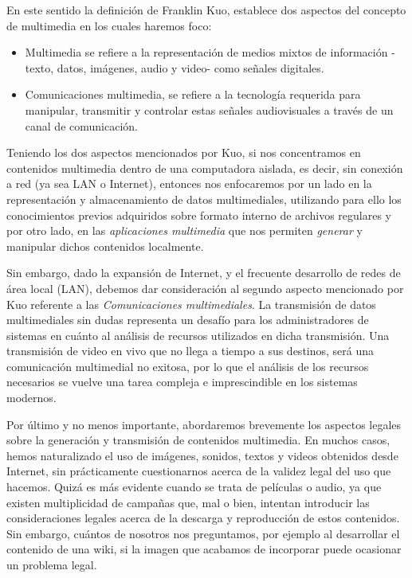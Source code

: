 \documentclass[12pt]{article}
\begin{document}
En este sentido la definición de Franklin Kuo, establece dos aspectos del
concepto de multimedia en los cuales haremos foco:

\begin{itemize}
\item Multimedia se refiere a la representación de medios mixtos de información
-texto, datos, imágenes, audio y video- como señales digitales. 
\item Comunicaciones multimedia, se refiere a la tecnología requerida para 
manipular, transmitir y controlar estas señales audiovisuales a través de un 
canal de comunicación.\cite{frankuo}
\end{itemize}


Teniendo los dos aspectos mencionados por Kuo, si nos concentramos en contenidos 
multimedia dentro de una computadora aislada, es decir, sin conexión a red (ya sea LAN o 
Internet), entonces nos enfocaremos por un lado en la representación y almacenamiento 
de datos multimediales, utilizando para ello los conocimientos previos 
adquiridos sobre formato interno de archivos regulares y por otro lado, en 
las {\it aplicaciones multimedia} que nos permiten {\it generar} y manipular 
dichos contenidos localmente. 

Sin embargo, dado la expansión de Internet, y el frecuente desarrollo 
de redes de área local (LAN), debemos dar consideración al segundo aspecto mencionado
por Kuo referente a las {\it Comunicaciones multimediales}. La transmisión 
de datos multimediales sin dudas representa un desafío para los administradores
de sistemas en cuánto al análisis de recursos utilizados en dicha transmisión.
Una transmisión de video en vivo que no llega a tiempo a sus destinos, será 
una comunicación multimedial no exitosa, por lo que el análisis de los 
recursos necesarios se vuelve una tarea compleja e imprescindible en los 
sistemas modernos. 

Por último y no menos importante, abordaremos brevemente los aspectos legales 
sobre la generación y transmisión de contenidos multimedia. En muchos casos,
hemos naturalizado el uso de imágenes, sonidos, textos y videos obtenidos 
desde Internet, sin prácticamente cuestionarnos acerca de la validez 
legal del uso que hacemos. Quizá es más evidente cuando se trata de 
películas o audio, ya que existen multiplicidad de campañas que, mal o 
bien, intentan introducir las consideraciones legales acerca de la descarga y 
reproducción de estos contenidos. Sin embargo, cuántos de nosotros nos 
preguntamos, por ejemplo al desarrollar el contenido de una wiki, si la 
imagen que acabamos de incorporar puede ocasionar un problema legal. 
\end{document}
